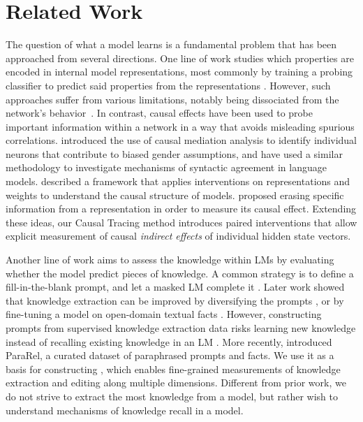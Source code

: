 \section{Related Work}


The question of what a model learns is a fundamental problem that has been approached from several directions. One line of work studies which properties are encoded in internal model representations, most commonly by training a probing classifier to predict said properties from the representations \citep[][inter alia]{ettinger-etal-2016-probing,adi:2017:ICLR,hupkes2018visualisation,conneau-etal-2018-cram,belinkov-etal-2017-neural,belinkov-glass-2019-analysis}. 
However, such approaches  suffer from various limitations, notably being 
 dissociated from the network's behavior~\citep{10.1162/coli_a_00422}. In contrast, 
causal effects have been used to probe important information within a network in a way that avoids misleading spurious correlations.
\citet{vig2020investigating,vig2020causal} introduced the use of causal mediation analysis to identify individual neurons that contribute to biased gender assumptions, and \citet{finlayson-etal-2021-causal} have used a similar methodology to investigate mechanisms of syntactic agreement in language models. 
\citet{feder2021causalm} described a framework that applies interventions on representations and weights to understand the causal structure of models.
\citet{elazar2021amnesic} proposed erasing specific information from a representation in order to measure its causal effect.
Extending these ideas, our Causal Tracing method introduces paired interventions that allow explicit measurement of causal \emph{indirect effects} \citep{pearl2001direct} of individual hidden state vectors.%

Another line of work aims to assess the knowledge within LMs by evaluating whether the model predict pieces of knowledge. A common strategy is to define a fill-in-the-blank prompt, and let a masked LM complete it \citep{petroni-etal-2019-language,petroni2020context}. Later work showed that knowledge extraction can be improved by diversifying the prompts \citep{jiang-etal-2020-know,zhong-etal-2021-factual}, or by fine-tuning a model on open-domain textual facts \citep{roberts-etal-2020-much}. However, constructing prompts from supervised knowledge extraction data risks learning new knowledge instead of recalling existing knowledge in an LM \citep{zhong-etal-2021-factual}. More recently, \citet{10.1162/tacl_a_00410} introduced ParaRel, a curated dataset of paraphrased prompts and facts. We use it as a basis for constructing \cfd, which enables fine-grained measurements of knowledge extraction and editing along multiple dimensions. 
Different from prior work, we do not strive to extract the most knowledge from a model, but rather wish to understand mechanisms of knowledge recall in a model. 

